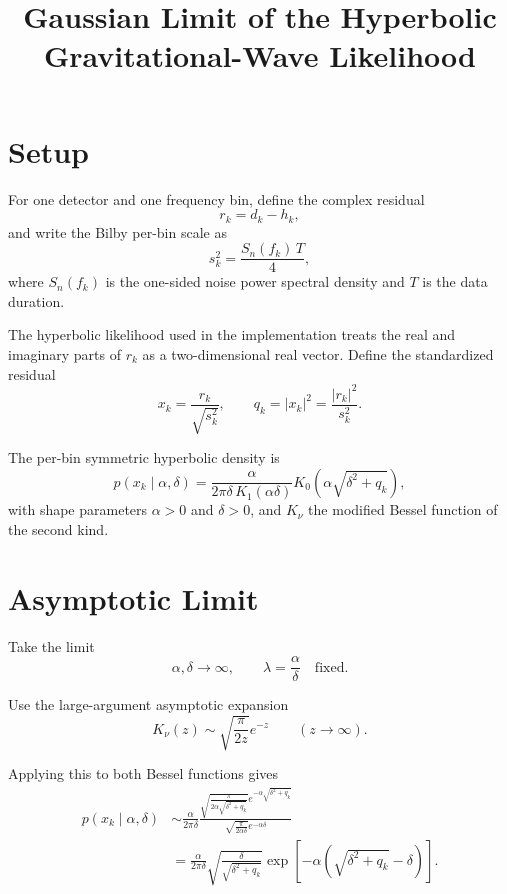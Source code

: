 \documentclass[11pt]{article}
\title{Gaussian Limit of the Hyperbolic Gravitational-Wave Likelihood}
\author{}
\date{}
\begin{document}
\maketitle

\section*{Setup}

For one detector and one frequency bin, define the complex residual
\begin{equation}
  r_k = d_k - h_k,
\end{equation}
and write the Bilby per-bin scale as
\begin{equation}
  s_k^2 = \frac{S_n(f_k)\,T}{4},
\end{equation}
where $S_n(f_k)$ is the one-sided noise power spectral density and $T$ is the data duration.

The hyperbolic likelihood used in the implementation treats the real and imaginary parts of
$r_k$ as a two-dimensional real vector. Define the standardized residual
\begin{equation}
  x_k = \frac{r_k}{\sqrt{s_k^2}},
  \qquad
  q_k = |x_k|^2 = \frac{|r_k|^2}{s_k^2}.
\end{equation}

The per-bin symmetric hyperbolic density is
\begin{equation}
  p(x_k \mid \alpha, \delta)
  =
  \frac{\alpha}{2\pi \delta\, K_1(\alpha\delta)}
  K_0\!\left(\alpha \sqrt{\delta^2 + q_k}\right),
\end{equation}
with shape parameters $\alpha > 0$ and $\delta > 0$, and $K_\nu$ the modified Bessel function
of the second kind.

\section*{Asymptotic Limit}

Take the limit
\begin{equation}
  \alpha, \delta \to \infty,
  \qquad
  \lambda = \frac{\alpha}{\delta}
  \quad \text{fixed}.
\end{equation}

Use the large-argument asymptotic expansion
\begin{equation}
  K_\nu(z) \sim \sqrt{\frac{\pi}{2z}} e^{-z}
  \qquad (z \to \infty).
\end{equation}

Applying this to both Bessel functions gives
\begin{align}
  p(x_k \mid \alpha, \delta)
  &\sim
  \frac{\alpha}{2\pi\delta}
  \frac{\sqrt{\frac{\pi}{2\alpha\sqrt{\delta^2 + q_k}}}
        e^{-\alpha\sqrt{\delta^2 + q_k}}}
       {\sqrt{\frac{\pi}{2\alpha\delta}} e^{-\alpha\delta}} \\
  &=
  \frac{\alpha}{2\pi\delta}
  \sqrt{\frac{\delta}{\sqrt{\delta^2 + q_k}}}
  \exp\!\left[-\alpha\left(\sqrt{\delta^2 + q_k} - \delta\right)\right].
\end{align}
\end{document}

